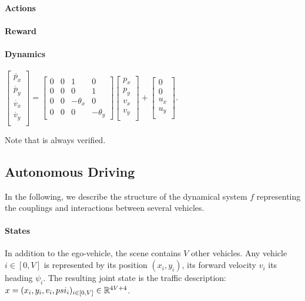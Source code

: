 \documentclass{article}
\begin{document}
\paragraph{Actions}
\paragraph{Reward}
\paragraph{Dynamics}

$
\begin{bmatrix}
\dot{p_x}\\
\dot{p_y}\\
\dot{v_x}\\
\dot{v_y}\\
\end{bmatrix} = 
\begin{bmatrix}
0 & 0 & 1 & 0 \\
0 & 0 & 0 & 1 \\
0 & 0 & -\theta_x & 0 \\
0 & 0 & 0 & -\theta_y
\end{bmatrix}
\begin{bmatrix}
{p_x}\\
{p_y}\\
{v_x}\\
{v_y}\\
\end{bmatrix}
+
\begin{bmatrix}
0\\
0\\
{u_x}\\
{u_y}\\
\end{bmatrix}.
$

Note that  is always verified. 

\subsection{Autonomous Driving}

In the following, we describe the structure of the dynamical system $f$ representing the couplings and interactions between several vehicles.

\paragraph{States}

In addition to the ego-vehicle, the scene contains $V$ other vehicles. Any vehicle $i\in[0,V]$ is represented by its position $(x_i, y_i)$, its forward velocity $v_i$ its heading $\psi_i$. The resulting joint state is the traffic description: $x = (x_i, y_i, v_i, psi_i)_{i\in[0,V]}\in\mathbb{R}^{4V+4}$.
\end{document}
